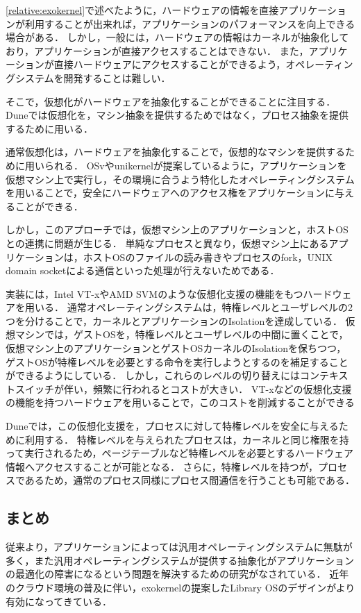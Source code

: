 \documentclass[graduation-thesis]{mlarticle}
\begin{document}
\ref{relative:exokernel}で述べたように，ハードウェアの情報を直接アプリケーションが利用することが出来れば，アプリケーションのパフォーマンスを向上できる場合がある．
しかし，一般には，ハードウェアの情報はカーネルが抽象化しており，アプリケーションが直接アクセスすることはできない．
また，アプリケーションが直接ハードウェアにアクセスすることができるよう，オペレーティングシステムを開発することは難しい．

そこで，仮想化がハードウェアを抽象化することができることに注目する．
Duneでは仮想化を，マシン抽象を提供するためではなく，プロセス抽象を提供するために用いる．

通常仮想化は，ハードウェアを抽象化することで，仮想的なマシンを提供するために用いられる．
OSvやunikernelが提案しているように，アプリケーションを仮想マシン上で実行し，その環境に合うよう特化したオペレーティングシステムを用いることで，安全にハードウェアへのアクセス権をアプリケーションに与えることができる．

しかし，このアプローチでは，仮想マシン上のアプリケーションと，ホストOSとの連携に問題が生じる．
単純なプロセスと異なり，仮想マシン上にあるアプリケーションは，ホストOSのファイルの読み書きやプロセスのfork，UNIX domain socketによる通信といった処理が行えないためである．

実装には，Intel VT-xやAMD SVMのような仮想化支援の機能をもつハードウェアを用いる．
通常オペレーティングシステムは，特権レベルとユーザレベルの2つを分けることで，カーネルとアプリケーションのIsolationを達成している．
仮想マシンでは，ゲストOSを，特権レベルとユーザレベルの中間に置くことで，仮想マシン上のアプリケーションとゲストOSカーネルのIsolationを保ちつつ，
ゲストOSが特権レベルを必要とする命令を実行しようとするのを補足することができるようにしている．
しかし，これらのレベルの切り替えにはコンテキストスイッチが伴い，頻繁に行われるとコストが大きい．
VT-xなどの仮想化支援の機能を持つハードウェアを用いることで，このコストを削減することができる

Duneでは，この仮想化支援を，プロセスに対して特権レベルを安全に与えるために利用する．
特権レベルを与えられたプロセスは，カーネルと同じ権限を持って実行されるため，ページテーブルなど特権レベルを必要とするハードウェア情報へアクセスすることが可能となる．
さらに，特権レベルを持つが，プロセスであるため，通常のプロセス同様にプロセス間通信を行うことも可能である．

\subsection{まとめ}
\label{relative:conclusion}
従来より，アプリケーションによっては汎用オペレーティングシステムに無駄が多く，また汎用オペレーティングシステムが提供する抽象化がアプリケーションの最適化の障害になるという問題を解決するための研究がなされている．
近年のクラウド環境の普及に伴い，exokernelの提案したLibrary OSのデザインがより有効になってきている．
\end{document}
